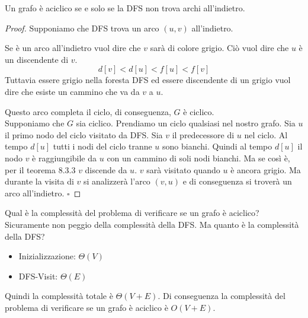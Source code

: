 \documentclass[a4paper]{article}
\begin{document}
\thm{}
{
  Un grafo è aciclico se e solo se la DFS non trova archi all'indietro.
}
\begin{proof}
 Supponiamo che DFS trova un arco $(u, v)$ all'indietro. 
 \begin{figure}[H]
  \centering
\end{figure}
\noindent
Se è un arco all'indietro vuol dire che $v$ sarà di colore grigio. Ciò vuol dire che $u$ è un discendente di $v$. 
\[d[v] < d[u] < f[u] < f[v]\]
Tuttavia essere grigio nella foresta DFS ed essere discendente di un grigio vuol dire che esiste un cammino che va da $v$ a $u$. 
\begin{figure}[H]
  \centering
\end{figure}
\noindent
Questo arco completa il ciclo, di conseguenza, $G$ è ciclico. \\
Supponiamo che $G$ sia ciclico. Prendiamo un ciclo qualsiasi nel nostro grafo. Sia $u$ il primo nodo del ciclo visitato da DFS. 
Sia $v$ il predecessore di $u$ nel ciclo. Al tempo $d[u]$ tutti i nodi del ciclo tranne $u$ sono bianchi. 
Quindi al tempo $d[u]$ il nodo $v$ è raggiungibile da $u$ con un cammino di soli nodi bianchi. Ma se così è, per il teorema 8.3.3 
$v$ discende da $u$. $v$ sarà visitato quando $u$ è ancora grigio. Ma durante la visita di $v$ si analizzerà l'arco $(v,u)$ e di conseguenza si troverà un arco all'indietro. $\square$
\end{proof}
Qual è la complessità del problema di verificare se un grafo è aciclico? 
Sicuramente non peggio della complessità della DFS. 
Ma quanto è la complessità della DFS?
\begin{itemize}
  \item Inizializzazione: $\Theta(V)$
  \item DFS-Visit: $\Theta(E)$
\end{itemize}
Quindi la complessità totale è $\Theta(V + E)$. Di conseguenza la complessità del problema di verificare se un grafo è aciclico è $O(V + E)$.
\end{document}
